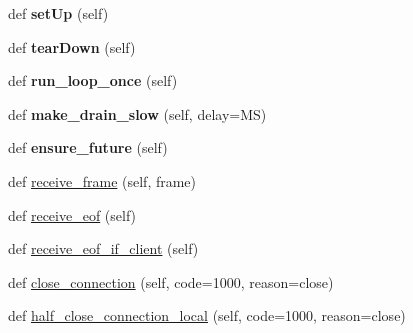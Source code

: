\begin{DoxyCompactItemize}
\item 
\mbox{\label{classwebsockets_1_1test__protocol_1_1_common_tests_a37684bc48c8b71216be7b9989cd40033}} 
def {\bfseries set\+Up} (self)
\item 
\mbox{\label{classwebsockets_1_1test__protocol_1_1_common_tests_a4fea0a65dea3dd3ee4af90126bdbbd53}} 
def {\bfseries tear\+Down} (self)
\item 
\mbox{\label{classwebsockets_1_1test__protocol_1_1_common_tests_a12f0d1531fed614aba8528b2189d4088}} 
def {\bfseries run\+\_\+loop\+\_\+once} (self)
\item 
\mbox{\label{classwebsockets_1_1test__protocol_1_1_common_tests_aa3a974ef61950972d04585ebd64cc33a}} 
def {\bfseries make\+\_\+drain\+\_\+slow} (self, delay=MS)
\item 
\mbox{\label{classwebsockets_1_1test__protocol_1_1_common_tests_a8775223e99b7202fc722e5a56c8301fd}} 
def {\bfseries ensure\+\_\+future} (self)
\item 
def \hyperlink{classwebsockets_1_1test__protocol_1_1_common_tests_a6452ee615a5c45fde6a0616f2a5e67f6}{receive\+\_\+frame} (self, frame)
\item 
def \hyperlink{classwebsockets_1_1test__protocol_1_1_common_tests_ac492a5ff533df2e78be496015f192a20}{receive\+\_\+eof} (self)
\item 
def \hyperlink{classwebsockets_1_1test__protocol_1_1_common_tests_af1c2c7d113da9e0c81657606142b9ee7}{receive\+\_\+eof\+\_\+if\+\_\+client} (self)
\item 
def \hyperlink{classwebsockets_1_1test__protocol_1_1_common_tests_a8d230d6cd9c4f2c3ddb81970ee2f73c9}{close\+\_\+connection} (self, code=1000, reason=\textquotesingle{}close\textquotesingle{})
\item 
def \hyperlink{classwebsockets_1_1test__protocol_1_1_common_tests_aba585cd1108bd941cb1172825d4f5829}{half\+\_\+close\+\_\+connection\+\_\+local} (self, code=1000, reason=\textquotesingle{}close\textquotesingle{})
\item 

\end{DoxyCompactItemize}
